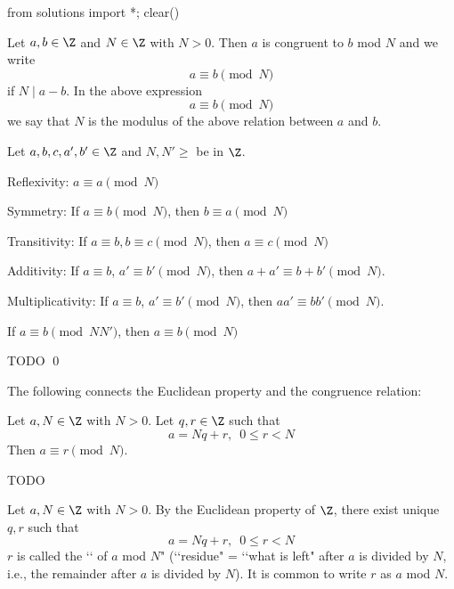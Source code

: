 \begin{python0}
from solutions import *; clear()
\end{python0}

\begin{defn}
  Let $a, b \in \Z$ and $N \in \Z$ with $N > 0$.
  Then $a$ is congruent to $b$ mod $N$ and we write
  \[
  a \equiv b \pmod{N}
  \]
  if $N \mid a - b$.
  In the above expression
  \[
  a \equiv b \pmod{N}
  \]
  we say that $N$ is the modulus of the above relation between $a$ and $b$.
\end{defn}

\begin{prop}
  Let $a,b,c,a',b' \in \Z$ and $N,N' \geq$ be in $\Z$.
  \begin{myenum}       
  \item \textnormal{Reflexivity:}
    $a \equiv a \pmod{N}$
  \item \textnormal{Symmetry:}
    If $a \equiv b \pmod{N}$, then $b \equiv a \pmod{N}$
  \item \textnormal{Transitivity:}
    If $a \equiv b, b \equiv c \pmod{N}$, then
    $a \equiv c \pmod{N}$
  \item \textnormal{Additivity:}
    If
    $a \equiv b$,
    $a' \equiv b' \pmod{N}$,
    then
    $a + a' \equiv b + b' \pmod{N}$.
  \item \textnormal{Multiplicativity:}
    If
    $a \equiv b$,
    $a' \equiv b' \pmod{N}$,
    then
    $a a' \equiv b b' \pmod{N}$.
  \item
    If
    $a \equiv b \pmod{NN'}$, then
    $a \equiv b \pmod{N}$
  \end{myenum}
\end{prop}
\proof
TODO
\qed

The following connects the Euclidean property and the congruence relation:

\begin{prop}
  Let $a, N \in \Z$ with $N > 0$.
  Let $q, r \in \Z$ such that
  \[
  a = Nq + r, \,\,\, 0 \leq r < N
  \]
  Then $a \equiv r \pmod{N}$.
\end{prop}
\proof
TODO

\begin{defn}
  Let $a, N \in \Z$ with $N > 0$.
  By the Euclidean property of $\Z$, there exist unique $q,r$ such that
  \[
  a = Nq + r, \,\,\, 0 \leq r < N
  \]
  $r$ is called the \lq\lq {} of $a$ mod $N$"
  (\lq\lq residue" = \lq\lq what is left" after $a$ is divided by $N$, i.e.,
  the remainder after $a$ is divided by $N$).
  It is common to write $r$ as $a$ mod $N$.
\end{defn}

